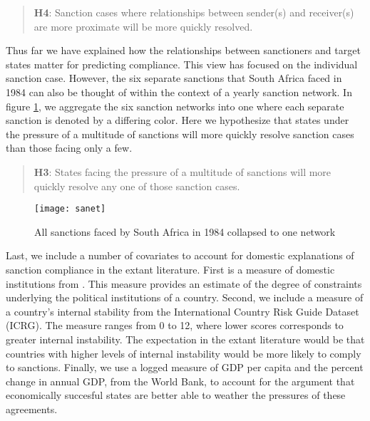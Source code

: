 \begin{quote}
	\textbf{H4}: Sanction cases where relationships between sender(s) and receiver(s) are more proximate will be more quickly resolved.
\end{quote}

Thus far we have explained how the relationships between sanctioners and target states matter for predicting compliance. This view has focused on the individual sanction case. However, the six separate sanctions that South Africa faced in 1984 can also be thought of within the context of a yearly sanction network. In figure \ref{fig:sanet}, we aggregate the six sanction networks into one where each separate sanction is denoted by a differing color. Here we hypothesize that states under the pressure of a multitude of sanctions will more quickly resolve sanction cases than those facing only a few.

\begin{quote}
	\textbf{H3}: States facing the pressure of a multitude of sanctions will more quickly resolve any one of those sanction cases.
\end{quote}

\begin{figure}[ht]
	\centering
	\texttt{[image: sanet]}
	\caption{All sanctions faced by South Africa in 1984 collapsed to one network}
	\label{fig:sanet}
\end{figure}
\FloatBarrier

Last, we include a number of covariates to account for domestic explanations of sanction compliance in the extant literature. First is a measure of domestic institutions from \citet{henisz2000a}. This measure provides an estimate of the degree of constraints underlying the political institutions of a country. Second, we include a measure of a country's internal stability from the International Country Risk Guide Dataset (ICRG). The measure ranges from 0 to 12, where lower scores corresponds to greater internal instability. The expectation in the extant literature would be that countries with higher levels of internal instability would be more likely to comply to sanctions. Finally, we use a logged measure of GDP per capita and the percent change in annual GDP, from the World Bank, to account for the argument that economically succesful states are better able to weather the pressures of these agreements.

